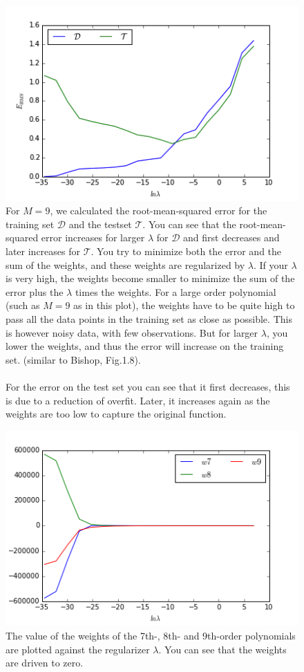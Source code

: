 \documentclass[a4paper,11pt]{article}
\theoremstyle{mytheor}
\begin{document}
\begin{enumerate}
		\begin{figure}[h!]
			\centering
			\includegraphics[scale=0.8]{1_5.png}\vspace{-0.5cm}
			\caption{For $M = 9$, we calculated the root-mean-squared error for the training set $\mathcal{D}$ and the testset $\mathcal{T}$. You can see that the root-mean-squared error increases for larger $\lambda$ for $\mathcal{D}$ and first decreases and later increases for $\mathcal{T}$. You try to minimize both the error and the sum of the weights, and these weights are regularized by $\lambda$. If your $\lambda$ is very high, the weights become smaller to minimize the sum of the error plus the $\lambda$ times the weights. For a large order polynomial (such as $M = 9$ as in this plot), the weights have to be quite high to pass all the data points in the training set as close as possible. This is however noisy data, with few observations. But for larger $\lambda$, you lower the weights, and thus the error will increase on the training set. (similar to Bishop, Fig.1.8).\\\\
For the error on the test set you can see that it first decreases, this is due to a reduction of overfit. Later, it increases again as the weights are too low to capture the original function.}
		\end{figure}
		\begin{figure}[h!]
			\centering
			\includegraphics[scale=0.8]{1_5_2.png}\vspace{-0.5cm}
			\caption{The value of the weights of the 7th-, 8th- and 9th-order polynomials are plotted against the regularizer $\lambda$. You can see that the weights are driven to zero. }
		\end{figure}


\end{enumerate}
\end{document}
